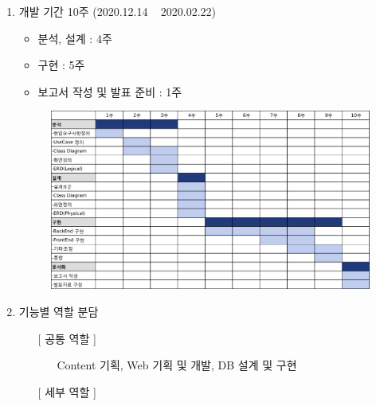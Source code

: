 \begin{enumerate}
    \item 개발 기간 10주 (2020.12.14 ~ 2020.02.22)
        \begin{itemize}
            \item 분석, 설계 : 4주
            \item 구현 : 5주
            \item 보고서 작성 및 발표 준비 : 1주
        \end{itemize}

        \begin{figure}[h]
            \begin{center}
                \includegraphics[width=16cm]{./Figure/devel.pdf}
            \end{center}
        \end{figure}


    \item 기능별 역할 분담
        \begin{itemize}
            \item[] [ 공통 역할 ] 
                \begin{itemize}
                    \item[] Content 기획, Web 기획 및 개발, DB 설계 및 구현
                \end{itemize}
            \item[] [ 세부 역할 ]
            

\end{itemize}
\end{enumerate}
